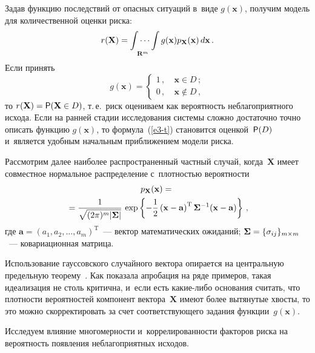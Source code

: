 \begin{multicols}{2}
  Задав функцию по\-след\-ст\-вий от опасных си\-ту\-аций в~виде $g(\mathbf{x})$, 
получим модель для количественной оцен\-ки риска:
  \begin{equation*}
  r(\mathbf{X})=\idotsint\limits_{\mathbf{R}^m} g(\mathbf{x}) 
p_{\mathbf{X}}(\mathbf{x})\,d\mathbf{x}\,.
  \end{equation*}
  Если принять
  \begin{equation}
  g(\mathbf{x})=\begin{cases}
  1\,, &\ \mathbf{x}\in D\,;\\
  0\,, &\ \mathbf{x}\notin D\,,
  \end{cases}
  \label{e3-t}
  \end{equation}
то $r(\mathbf{X})={\sf P}(\mathbf{X}\in D)$, т.\,е.\ риск оцениваем как ве\-ро\-ят\-ность 
неблагоприятного исхода. Если на ранней стадии исследования сис\-те\-мы 
слож\-но до\-ста\-точ\-но точ\-но описать функцию $g(\mathbf{x})$, то 
формула~(\ref{e3-t}) становится оценкой~${\sf P}(D)$ и~является удоб\-ным 
начальным приб\-ли\-же\-ни\-ем модели риска.

  Рассмотрим далее наиболее рас\-про\-стра\-нен\-ный част\-ный случай, 
когда~$\mathbf{X}$ имеет совместное нормальное рас\-пре\-де\-ле\-ние с~плот\-ностью 
ве\-ро\-ят\-ности
\begin{multline*}
  p_{\mathbf{X}}(\mathbf{x})={}\\
  {}=\displaystyle\frac{\displaystyle 1\mathstrut}{\displaystyle \sqrt{(2\pi)^m\vert\boldsymbol{\Sigma}\vert}\mathstrut}\,\exp 
\left\{ -\displaystyle\frac{\displaystyle 1\mathstrut}{\displaystyle 2\mathstrut}\left( \mathbf{x}-\mathbf{a}\right)^{\mathrm{T}} 
\boldsymbol{\Sigma}^{-1}(\mathbf{x}-\mathbf{a})\right\}\,,
  \end{multline*}
где $\mathbf{a}=(a_1, a_2, \ldots, a_m)^{\mathrm{T}}$~--- век\-тор 
математических ожиданий; $\boldsymbol{\Sigma}\hm= \{ \sigma_{ij}\}_{m\times 
m}$~--- ковариационная мат\-рица.
  
  Использование гауссовского случайного век\-то\-ра опирается на цент\-раль\-ную 
предельную тео\-ре\-му~\cite{11-t}. Как показала апробация на ряде примеров, 
такая идеализация не столь критична, и~если есть ка\-кие-ли\-бо основания 
считать, что плот\-но\-сти вероятностей компонент вектора~$\mathbf{X}$ име\-ют 
более вытянутые хвос\-ты, то это можно скорректировать за счет 
со\-от\-вет\-ст\-ву\-юще\-го задания функции~$g(\mathbf{x})$.
  
  Исследуем влияние многомерности и~коррелированности факторов риска на 
ве\-ро\-ят\-ность по\-яв\-ле\-ния неблагоприятных исходов.
  
  \smallskip
  

\end{multicols}
